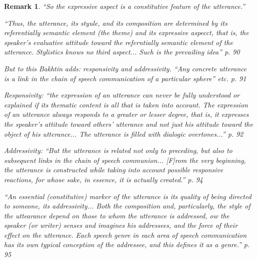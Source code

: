 \documentclass[11pt,twoside]{article}
\newtheorem{remark}{Remark}
\begin{document}
\begin{remark}
  ``So the expressive aspect is a constitutive feature of the utterance.''

``Thus, the utterance, its styule, and its composition are determined
  by its referentially semantic element (the theme) and its expressive
  aspecct, that is, the speaker's evaluative attitude toward the
  referntially semantic element of the utterance.  Stylistics knows no
  third aspect... Such is the prevailing idea'' p. 90

But to this Bakhtin adds: responsivity and addressivity.  ``Any
concrete utterance is a link in the chain of speech communication of a
particular sphere'' etc. p. 91

Responsivity: ``the expression of an utterance can never be fully
understood or explained if its thematic content is all that is taken
into account.  The expression of an utterance always \textit{responds}
to a greater or lesser degree, that is, it expresses the speaker's
attitude toward others' utterance and not just his attitude toward the
object of his utterance... The utterance is filled with
\textit{dialogic overtones}...'' p. 92

Addressivity: ``But the utterance is related not only to preceding,
but also to subsequent links in the chain of speech communion...
[F]rom the very beginning, the utterance is constructed while taking
into account possible responsive reactions, for whose sake, in
essence, it is actually created.'' p. 94

``An essential (constitutive) marker of the utterance is its quality
of being directed to someone, its \textit{addressivity}... Both the
composition and, particularly, the style of the uttearance depend on
those to whom the utterance is addressed, ow the speaker (or writer)
senses and imagines his addressees, and the force of their effect on
the utterance.  Each speech genre in each area of speech communication
has its own typical conception of the addressee, and this defines it
as a genre.''  p. 95
\end{remark}


\cite{bakhtin_problem_1986}

\cite{junefelt_proceedings_2009}

\cite{linell_respect_2009}

\cite{linell_rethinking_2009}

\cite{markova_coding_2007}

\cite{linell_communicative_2010}
\end{document}
